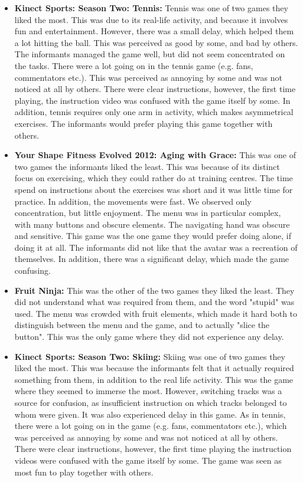 \begin{itemize}
\item \textbf{Kinect Sports: Season Two: Tennis:} Tennis was one of two games they liked the most. This was due to its real-life activity, and because it involves fun and entertainment. However, there was a small delay, which helped them a lot hitting the ball. This was perceived as good by some, and bad by others. The informants managed the game well, but did not seem concentrated on the tasks. There were a lot going on in the tennis game (e.g. fans, commentators etc.). This was perceived as annoying by some and was not noticed at all by others. There were clear instructions, however, the first time playing, the instruction video was confused with the game itself by some. In addition, tennis requires only one arm in activity, which makes asymmetrical exercises. The informants would prefer playing this game together with others. 

\item \textbf{Your Shape Fitness Evolved 2012: Aging with Grace:} This was one of two games the informants liked the least. This was because of its distinct focus on exercising, which they could rather do at training centres.  The time spend on instructions about the exercises was short and it was little time for practice. In addition, the movements were fast.  We observed only concentration, but little enjoyment. The menu was in particular complex, with many buttons and obscure elements. The navigating hand was obscure and sensitive. This game was the one game they would prefer doing alone, if doing it at all. The informants did not like that the avatar was a recreation of themselves. In addition, there was a significant delay, which made the game confusing.

\item \textbf{Fruit Ninja:} This was the other of the two games they liked the least.  They did not understand what was required from them, and the word "stupid" was used. The menu was crowded with fruit elements, which made it hard both to distinguish between the menu and the game, and to actually "slice the button". This was the only game where they did not experience any delay.

\item \textbf{Kinect Sports: Season Two: Skiing:} Skiing was one of two games they liked the most. This was because the informants felt that it actually required something from them, in addition to the real life activity. This was the game where they seemed to immerse the most. However, switching tracks was a source for confusion, as insufficient instruction on which tracks belonged to whom were given. It was also experienced delay in this game. As in tennis, there were a lot going on in the game (e.g. fans, commentators etc.), which was perceived as annoying by some and was not noticed at all by others. There were clear instructions, however, the first time playing the instruction videos were confused with the game itself by some. The game was seen as most fun to play together with others. 
\end{itemize}

